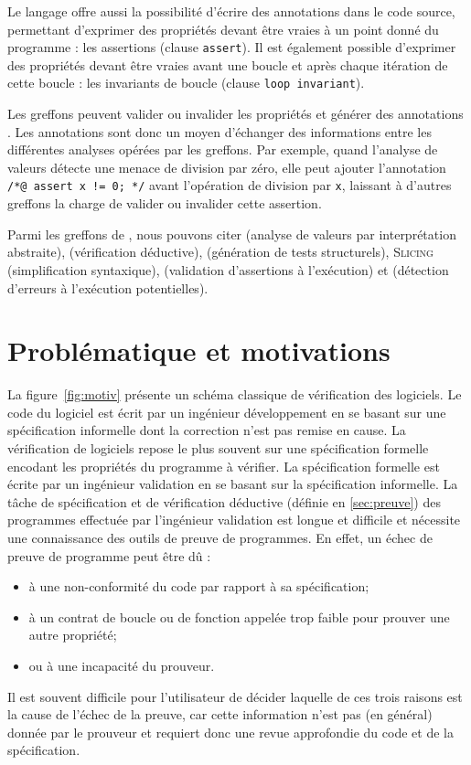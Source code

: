Le langage \acsl offre aussi la possibilité d'écrire des annotations dans le
code source, permettant d'exprimer des propriétés devant être vraies à un point
donné du programme : les assertions (clause \lstinline'assert').
Il est également possible d'exprimer des propriétés devant être vraies avant une
boucle et après chaque itération de cette boucle : les invariants de boucle
(clause \lstinline'loop invariant').

Les greffons peuvent valider ou invalider les propriétés \acsl et
générer des annotations \acsl.
Les annotations sont donc un moyen d'échanger des informations entre les
différentes analyses opérées par les greffons.
Par exemple, quand l'analyse de valeurs détecte une menace de division par zéro,
elle peut ajouter l'annotation \lstinline'/*@ assert x != 0; */' avant
l'opération de division par \lstinline'x', laissant à d'autres greffons la
charge de valider ou invalider cette assertion.

Parmi les greffons de \framac, nous pouvons citer \Value (analyse de valeurs par
interprétation abstraite), \Wp (vérification déductive), \pathcrawler
(génération de tests structurels), \textsc{Slicing} (simplification syntaxique),
\eacsltoc (validation d'assertions à l'exécution) et \rte (détection
d'erreurs à l'exécution potentielles).


\section{Problématique et motivations}
\label{sec:pb-motiv}


La figure~\ref{fig:motiv} présente un schéma classique de vérification des
logiciels.
Le code du logiciel est écrit par un ingénieur développement en se basant sur
une spécification informelle dont la correction n'est pas remise en cause.
La vérification de logiciels repose le plus souvent sur une spécification
formelle encodant les propriétés du programme à vérifier.
La spécification formelle est écrite par un ingénieur validation en se basant
sur la spécification informelle.
La tâche de spécification et de vérification déductive (définie en
\ref{sec:preuve}) des programmes effectuée par l'ingénieur validation est longue
et difficile et nécessite une connaissance des outils de preuve de programmes.
En effet, un échec de preuve de programme peut être dû :
\begin{itemize}
\item à une non-conformité du code par rapport à sa spécification;
\item à un contrat de boucle ou de fonction appelée  trop faible pour prouver
  une autre propriété;
\item ou à une incapacité du prouveur.
\end{itemize}
Il est souvent difficile pour l'utilisateur de décider laquelle de ces trois
raisons est la cause de l'échec de la preuve, car cette information n'est pas
(en général) donnée par le prouveur et requiert donc une revue approfondie
du code et de la spécification.

